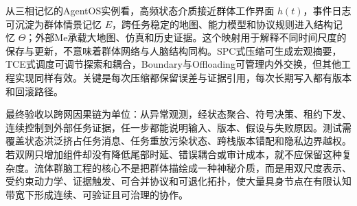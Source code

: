从三相记忆的AgentOS实例看，高频状态介质接近群体工作界面 $h(t)$，事件日志可沉淀为群体情景记忆 $E$，跨任务稳定的地图、能力模型和协议规则进入结构记忆 $\Theta$；外部Me承载大地图、仿真和历史证据。这个映射用于解释不同时间尺度的保存与更新，不意味着群体网络与人脑结构同构。SPC式压缩可生成宏观摘要，TCE式调度可调节探索和耦合，Boundary与Offloading可管理内外交换，但其他工程实现同样有效。关键是每次压缩都保留误差与证据引用，每次长期写入都有版本和回滚路径。

最终验收以跨网因果链为单位：从异常观测，经状态聚合、符号决策、租约下发、连续控制到外部任务证据，任一步都能说明输入、版本、假设与失败原因。测试需覆盖状态洪泛挤占任务消息、任务重放污染状态、跨栈版本错配和隐私边界越权。若双网只增加组件却没有降低尾部时延、错误耦合或审计成本，就不应保留这种复杂度。流体群脑工程的核心不是把群体描绘成一种神秘介质，而是用双尺度表示、受约束动力学、证据触发、可合并协议和可退化拓扑，使大量具身节点在有限认知带宽下形成连续、可验证且可治理的协作。
